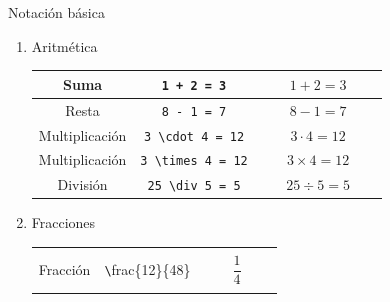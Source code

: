 \documentclass[../slides.tex]{subfiles}
\begin{document}
    \begin{frame}{Notación básica}
        \begin{enumerate}
            \item Aritmética
                \begin{center}
                \begin{tabular}{|c|c|c|}
                \hline
                    Suma & \texttt{1 + 2 = 3} & $\quad\quad1 + 2 = 3\quad\quad$\\
                \hline
                    Resta & \texttt{8 - 1 = 7} & $8 - 1 = 7$\\
                \hline
                    Multiplicación & \texttt{3 \textbackslash cdot 4 = 12} & $3 \cdot 4 = 12$\\
                \hline
                    Multiplicación & \texttt{3 \textbackslash times 4 = 12} & $3 \times 4 = 12$\\
                \hline
                    División & \texttt{25 \textbackslash div 5 = 5} & $25 \div 5 = 5$\\
                \hline
                \end{tabular}
                \end{center}
            \item Fracciones
                \begin{center}
                \begin{tabular}{|c|c|c|}
                \hline
                    & & \\
                    Fracción & \texttt \textbackslash frac\{12\}\{48\} & $\quad\quad\dfrac{1}{4}\quad\quad$ \\
                    & & \\
                \hline
                \end{tabular}
                \end{center}
        \end{enumerate}

    \end{frame}
\end{document}
